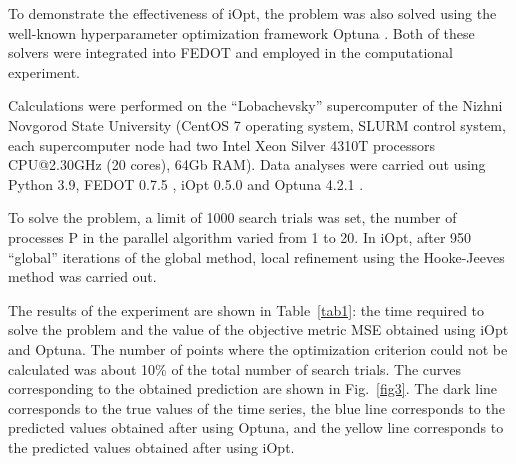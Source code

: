 \documentclass[runningheads]{llncs}
\begin{document}
To demonstrate the effectiveness of iOpt, the problem was also solved using the well-known hyperparameter optimization framework Optuna \cite{OptunaURL,optuna}. Both of these solvers were integrated into FEDOT and employed in the computational experiment.

Calculations were performed on the ``Lobachevsky'' supercomputer of the Nizhni Novgorod State University (CentOS 7 operating system, SLURM control system, each supercomputer node had two Intel Xeon Silver 4310T processors CPU@2.30GHz (20 cores), 64Gb RAM). Data analyses were carried out using Python 3.9, FEDOT 0.7.5 \cite{FEDOT}, iOpt 0.5.0 \cite{iOptURL} and Optuna 4.2.1 \cite{OptunaURL}.

To solve the problem, a limit of 1000 search trials was set, the number of processes P in the parallel algorithm varied from 1 to 20. In iOpt, after 950 ``global'' iterations of the global method, local refinement using the Hooke-Jeeves method was carried out.  %

%
%
%
%
The results of the experiment are shown in Table~\ref{tab1}: the time required to solve the problem and the value of the objective metric MSE obtained using iOpt and Optuna. The number of points where the optimization criterion could not be calculated was about 10\% of the total number of search trials. The curves corresponding to the obtained prediction are shown in Fig.~\ref{fig3}. The dark line corresponds to the true values of the time series, the blue line corresponds to the predicted values obtained after using Optuna, and the yellow line corresponds to the predicted values obtained after using iOpt. 
\end{document}

